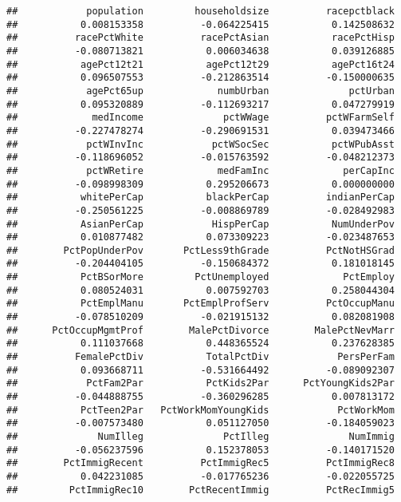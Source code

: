 \documentclass[
]{article}
\begin{document}
\begin{verbatim}
##            population         householdsize          racepctblack 
##           0.008153358          -0.064225415           0.142508632 
##          racePctWhite          racePctAsian           racePctHisp 
##          -0.080713821           0.006034638           0.039126885 
##           agePct12t21           agePct12t29           agePct16t24 
##           0.096507553          -0.212863514          -0.150000635 
##            agePct65up             numbUrban              pctUrban 
##           0.095320889          -0.112693217           0.047279919 
##             medIncome              pctWWage          pctWFarmSelf 
##          -0.227478274          -0.290691531           0.039473466 
##            pctWInvInc            pctWSocSec           pctWPubAsst 
##          -0.118696052          -0.015763592          -0.048212373 
##            pctWRetire             medFamInc             perCapInc 
##          -0.098998309           0.295206673           0.000000000 
##           whitePerCap           blackPerCap          indianPerCap 
##          -0.250561225          -0.008869789          -0.028492983 
##           AsianPerCap            HispPerCap           NumUnderPov 
##           0.010877482           0.073309223          -0.023487653 
##        PctPopUnderPov       PctLess9thGrade          PctNotHSGrad 
##          -0.204404105          -0.150684372           0.181018145 
##           PctBSorMore         PctUnemployed             PctEmploy 
##           0.080524031           0.007592703           0.258044304 
##           PctEmplManu       PctEmplProfServ          PctOccupManu 
##          -0.078510209          -0.021915132           0.082081908 
##      PctOccupMgmtProf        MalePctDivorce        MalePctNevMarr 
##           0.111037668           0.448365524           0.237628385 
##          FemalePctDiv           TotalPctDiv            PersPerFam 
##           0.093668711          -0.531664492          -0.089092307 
##            PctFam2Par           PctKids2Par      PctYoungKids2Par 
##          -0.044888755          -0.360296285           0.007813172 
##           PctTeen2Par   PctWorkMomYoungKids            PctWorkMom 
##          -0.007573480           0.051127050          -0.184059023 
##              NumIlleg              PctIlleg              NumImmig 
##          -0.056237596           0.152378053          -0.140171520 
##        PctImmigRecent          PctImmigRec5          PctImmigRec8 
##           0.042231085          -0.017765236          -0.022055725 
##         PctImmigRec10        PctRecentImmig          PctRecImmig5 

\end{verbatim}
\end{document}
